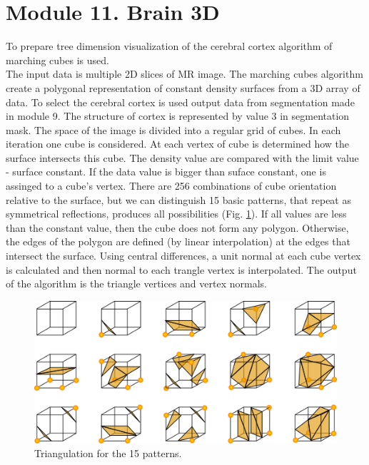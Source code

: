 \section{Module 11. Brain 3D}

\indent To prepare tree dimension visualization of the cerebral cortex algorithm of marching cubes
is used.\\
 \indent The input data is multiple 2D slices of MR image. The marching cubes algorithm create a polygonal representation of constant density surfaces from a 3D array of data. To select the cerebral cortex is used output data from segmentation made in module 9. The structure of cortex is represented by value 3 in segmentation mask. 
\indent The space of the image is divided into a regular grid of cubes. In each iteration one cube is considered. At each vertex of cube is determined how the surface intersects this cube. The density value are compared with the limit value - surface constant. If the data value is bigger than suface constant, one is assinged to a cube’s vertex. There are 256 combinations of cube orientation relative to the surface, but we can distinguish 15 basic patterns, that repeat as symmetrical reflections, produces all possibilities (Fig. \ref{fig:figures/Marching cubes}). If all values are less than the constant value, then the cube does not form any polygon. Otherwise, the edges of the polygon are defined (by linear interpolation) at the edges that intersect the surface. Using central differences, a unit normal at each cube vertex is calculated and then normal to each trangle vertex is interpolated. The output of the algorithm is the triangle vertices and vertex normals.

\begin{figure}[H]
\centering{}\includegraphics[scale=0.7]{figures/MarchingCubes}\caption{Triangulation for the 15 patterns. \label{fig:figures/Marching cubes}}
\end{figure}

